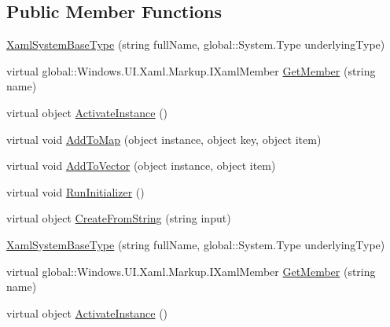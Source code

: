 \subsection*{Public Member Functions}
\begin{DoxyCompactItemize}
\item 
\hyperlink{class_eli_log_in_app_1_1_eli_log_in_app___xaml_type_info_1_1_xaml_system_base_type_a41decf5b936f07eec2dd5f81d55bac76}{Xaml\+System\+Base\+Type} (string full\+Name, global\+::\+System.\+Type underlying\+Type)
\item 
virtual global\+::\+Windows.\+U\+I.\+Xaml.\+Markup.\+I\+Xaml\+Member \hyperlink{class_eli_log_in_app_1_1_eli_log_in_app___xaml_type_info_1_1_xaml_system_base_type_a9fafc5073fe416f1c73685c65e01cce7}{Get\+Member} (string name)
\item 
virtual object \hyperlink{class_eli_log_in_app_1_1_eli_log_in_app___xaml_type_info_1_1_xaml_system_base_type_a77ebd9293eddf50b03c4973efd4dcd6f}{Activate\+Instance} ()
\item 
virtual void \hyperlink{class_eli_log_in_app_1_1_eli_log_in_app___xaml_type_info_1_1_xaml_system_base_type_a4dffdc8ec19394a69290fe35b0c1af77}{Add\+To\+Map} (object instance, object key, object item)
\item 
virtual void \hyperlink{class_eli_log_in_app_1_1_eli_log_in_app___xaml_type_info_1_1_xaml_system_base_type_a8e642a4b95d9f9005400a4a679712152}{Add\+To\+Vector} (object instance, object item)
\item 
virtual void \hyperlink{class_eli_log_in_app_1_1_eli_log_in_app___xaml_type_info_1_1_xaml_system_base_type_a370a5c7e927ff1516755990b37949053}{Run\+Initializer} ()
\item 
virtual object \hyperlink{class_eli_log_in_app_1_1_eli_log_in_app___xaml_type_info_1_1_xaml_system_base_type_a8d9cb74aeb00c1919991b90adcc67373}{Create\+From\+String} (string input)
\item 
\hyperlink{class_eli_log_in_app_1_1_eli_log_in_app___xaml_type_info_1_1_xaml_system_base_type_a41decf5b936f07eec2dd5f81d55bac76}{Xaml\+System\+Base\+Type} (string full\+Name, global\+::\+System.\+Type underlying\+Type)
\item 
virtual global\+::\+Windows.\+U\+I.\+Xaml.\+Markup.\+I\+Xaml\+Member \hyperlink{class_eli_log_in_app_1_1_eli_log_in_app___xaml_type_info_1_1_xaml_system_base_type_a9fafc5073fe416f1c73685c65e01cce7}{Get\+Member} (string name)
\item 
virtual object \hyperlink{class_eli_log_in_app_1_1_eli_log_in_app___xaml_type_info_1_1_xaml_system_base_type_a77ebd9293eddf50b03c4973efd4dcd6f}{Activate\+Instance} ()

\end{DoxyCompactItemize}
